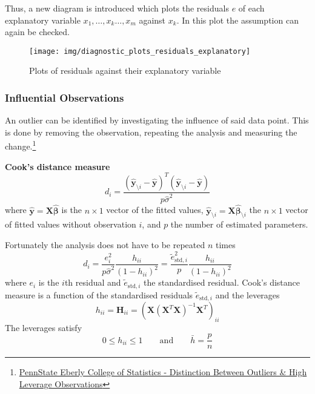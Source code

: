 \documentclass[11pt]{article}
\theoremstyle{definition}
\begin{document}
Thus, a new diagram is introduced which plots the residuals $e$ of each explanatory variable $x_1,\dots,x_k\dots,x_m$ against $x_k$. In this plot the assumption can again be checked.
\begin{figure}[H]
	\centering
	\texttt{[image: img/diagnostic\_plots\_residuals\_explanatory]}
	\caption{Plots of residuals against their explanatory variable}
	\label{fig:diagnosticplotsresidualsexplanatory}
\end{figure}

\subsubsection{Influential Observations}
An outlier can be identified by investigating the influence of said data point. This is done by removing the observation, repeating the analysis and measuring the change.\footnote{\href{https://online.stat.psu.edu/stat501/lesson/11/11.1}{PennState Eberly College of Statistics - Distinction Between Outliers \& High Leverage Observations}}

\vspace{1em}
\noindent
\textbf{Cook's distance measure}
\begin{equation*}
	d_i  = \frac{(\hat{\bm{y}}_{\setminus i} - \hat{\bm{y}})^T(\hat{\bm{y}}_{\setminus i} - \hat{\bm{y}})}{p\hat{\sigma}^2}
\end{equation*}
where $\hat{\bm{y}}=\bm{X}\hat{\bm{\beta}}$ is the $n\times1$ vector of the fitted values, $\hat{\bm{y}}_{\setminus i}=\bm{X}\hat{\bm{\beta}}_{\setminus i}$ the $n\times1$ vector of fitted values without observation $i$, and $p$ the number of estimated parameters.

Fortunately the analysis does not have to be repeated $n$ times
\begin{equation*}
	d_i = \frac{e_i^2}{p\hat{\sigma}^2}\frac{h_{ii}}{(1-h_{ii})^2} = \frac{\tilde{e}_{\text{std}, i}^2}{p}\frac{h_{ii}}{(1-h_{ii})^2}
\end{equation*}
where $e_i$ is the $i$th residual and $\tilde{e}_{\text{std},i}$ the standardised residual. Cook's distance measure is a function of the standardised residuals $\tilde{e}_{\text{std},i}$ and the leverages
\begin{equation*}
	h_{ii} = \bm{H}_{ii} = \left(\bm{X}\left(\bm{X}^T\bm{X}\right)^{-1}\bm{X}^T\right)_{ii}
\end{equation*}
The leverages satisfy
\begin{equation*}
	0\leq h_{ii}\leq 1\qquad\text{and}\qquad \bar{h} = \frac{p}{n}
\end{equation*}
\end{document}
